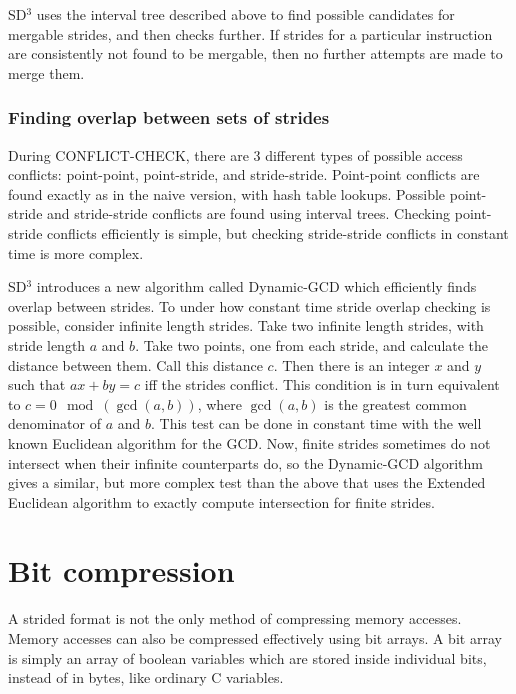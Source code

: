 \documentclass[12pt,twoside]{reedthesis}
\begin{document}
		SD$^3$ uses the interval tree described above to find possible candidates for mergable strides, and then checks further. If strides for a particular instruction are consistently not found to be mergable, then no further attempts are made to merge them. 
		
		\subsubsection{Finding overlap between sets of strides}
		
		During CONFLICT-CHECK, there are 3 different types of possible access conflicts: point-point, point-stride, and stride-stride. Point-point conflicts are found exactly as in the naive version, with hash table lookups. Possible point-stride and stride-stride conflicts are found using interval trees. Checking point-stride conflicts efficiently is simple, but checking stride-stride conflicts in constant time is more complex. 
		
		SD$^3$ introduces a new algorithm called Dynamic-GCD which efficiently finds overlap between strides. 
		To under how constant time stride overlap checking is possible, consider infinite length strides. Take two infinite length strides, with stride length $a$ and $b$. Take two points, one from each stride, and calculate the distance between them. Call this distance $c$. Then there is an integer $x$ and $y$ such that $ax + by = c$ iff the strides conflict. This condition is in turn equivalent to $c = 0 \mod (\gcd(a,b))$, where $\gcd(a,b)$ is the greatest common denominator of $a$ and $b$. This test can be done in constant time with the well known Euclidean algorithm for the GCD. Now, finite strides sometimes do not intersect when their infinite counterparts do, so the Dynamic-GCD algorithm gives a similar, but more complex test than the above that uses the Extended Euclidean algorithm to exactly compute intersection for finite strides. 
		
	\section{Bit compression}\label{s:bit-compress}
	
		A strided format is not the only method of compressing memory accesses. Memory accesses can also be compressed effectively using bit arrays. A bit array is simply an array of boolean variables which are stored inside individual bits, instead of in bytes, like ordinary C variables. 
		
\end{document}
